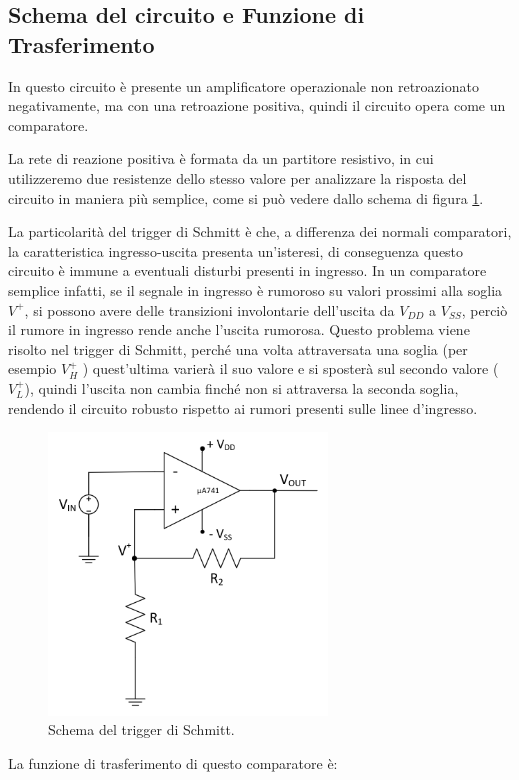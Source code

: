 \documentclass{report}
\begin{document}
\subsection{Schema del circuito e Funzione di Trasferimento}
In questo circuito è presente un amplificatore operazionale non retroazionato negativamente, ma con una retroazione positiva, quindi il circuito opera come un comparatore.\par
La rete di reazione positiva è formata da un partitore resistivo, in cui utilizzeremo due resistenze dello stesso valore per analizzare la risposta del circuito in maniera più semplice, come si può vedere dallo schema di figura \ref{figura:schema2}.\par
La particolarità del trigger di Schmitt è che, a differenza dei normali comparatori, la caratteristica ingresso-uscita presenta un'isteresi, di conseguenza questo circuito è immune a eventuali disturbi presenti in ingresso. In un comparatore semplice infatti, se il segnale in ingresso è rumoroso su valori prossimi alla soglia ${V^+}$, si possono avere delle transizioni involontarie dell'uscita da ${V_{DD}}$ a ${V_{SS}}$, perciò il rumore in ingresso rende anche l'uscita rumorosa. Questo problema viene risolto nel trigger di Schmitt, perché una volta attraversata una soglia (per esempio ${V_H^+}$ ) quest'ultima varierà il suo valore e si sposterà sul secondo valore (${V_L^+}$), quindi l'uscita non cambia finché non si attraversa la seconda soglia, rendendo il circuito robusto rispetto ai rumori presenti sulle linee d'ingresso.\par
\begin{figure}[h]
	\centering
	\includegraphics[height=7.5cm]{immagini/schema2}
	\caption{Schema del trigger di Schmitt.}
	\label{figura:schema2}
\end{figure}
La funzione di trasferimento di questo comparatore è:\\
\end{document}
